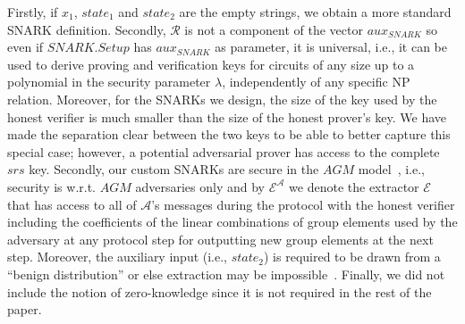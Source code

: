 \noindent Firstly, if $x_1$, $\mathit{state_1}$ and $\mathit{state_2}$ are the empty strings, we obtain a more standard SNARK definition.
Secondly, $\mathcal{R}$ is not a component of the vector $\mathit{aux_{\mathit{SNARK}}}$ so even if $\mathit{SNARK.Setup}$ has 
$\mathit{aux_{\mathit{SNARK}}}$ as parameter, it is universal, 
i.e., it can be used to derive proving and verification keys for circuits of any size up to a polynomial in the security parameter $\lambda$,   
independently of any specific NP relation. Moreover, for the SNARKs we design, the size of the key used by 
the honest verifier is much smaller than the size of the honest prover's key. We have made the separation clear between the two keys to be able 
to better capture this special case; however, a potential adversarial prover has access to the complete $\mathit{srs}$ key. 
Secondly, our custom SNARKs are secure in the $\mathit{AGM}$ model~\cite{AGM_model}, i.e., security is w.r.t. $\mathit{AGM}$ adversaries only 
and by $\mathcal{E}^{\mathcal{A}}$ we denote the extractor $\mathcal{E}$ that has access to all of 
$\mathcal{A}$'s messages during the protocol with the honest verifier including the coefficients of the linear combinations of 
group elements used by the adversary at any protocol step for outputting new group elements at the next step. 
Moreover, the auxiliary input (i.e., $\mathit{state_2}$) is required to be drawn from a ``benign distribution'' or else extraction may be 
impossible~\cite{extractability_limits_1,extractability_limits_2}. 
Finally, we did not include the notion of zero-knowledge since it is not required in the rest of the paper.
\vspace{-0.07in}